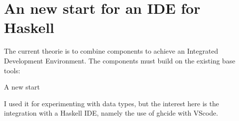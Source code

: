 \documentclass[a4paper,10pt]{scrbook}\usepackage{tgpagella} %
\begin{document}
\hypertarget{an-new-start-for-an-ide-for-haskell}{%
	\section{An new start for an IDE for
		Haskell}\label{an-new-start-for-an-ide-for-haskell}}

The current theorie is to combine components to achieve an Integrated
Development Environment. The components must build on the existing base
tools:

\begin{itemize}
	A new start
\end{itemize}

I used it for experimenting with data types, but the interest here is
the integration with a Haskell IDE, namely the use of ghcide with
VScode.

 

\printindex
\end{document}
